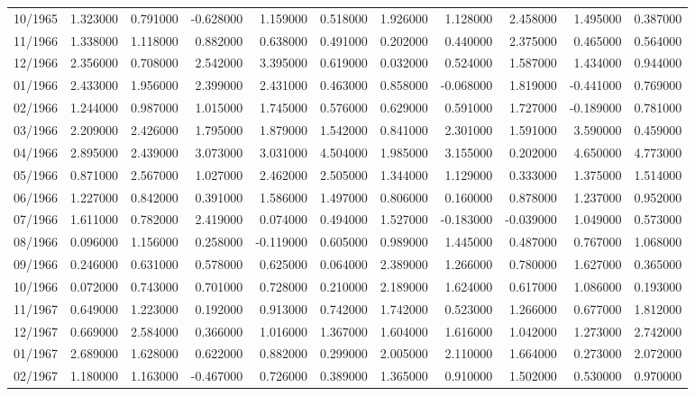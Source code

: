 \begin{tabular}{lrrrrrrrrrr}
10/1965 & 1.323000 & 0.791000 & -0.628000 & 1.159000 & 0.518000 & 1.926000 & 1.128000 & 2.458000 & 1.495000 & 0.387000 \\
11/1966 & 1.338000 & 1.118000 & 0.882000 & 0.638000 & 0.491000 & 0.202000 & 0.440000 & 2.375000 & 0.465000 & 0.564000 \\
12/1966 & 2.356000 & 0.708000 & 2.542000 & 3.395000 & 0.619000 & 0.032000 & 0.524000 & 1.587000 & 1.434000 & 0.944000 \\
01/1966 & 2.433000 & 1.956000 & 2.399000 & 2.431000 & 0.463000 & 0.858000 & -0.068000 & 1.819000 & -0.441000 & 0.769000 \\
02/1966 & 1.244000 & 0.987000 & 1.015000 & 1.745000 & 0.576000 & 0.629000 & 0.591000 & 1.727000 & -0.189000 & 0.781000 \\
03/1966 & 2.209000 & 2.426000 & 1.795000 & 1.879000 & 1.542000 & 0.841000 & 2.301000 & 1.591000 & 3.590000 & 0.459000 \\
04/1966 & 2.895000 & 2.439000 & 3.073000 & 3.031000 & 4.504000 & 1.985000 & 3.155000 & 0.202000 & 4.650000 & 4.773000 \\
05/1966 & 0.871000 & 2.567000 & 1.027000 & 2.462000 & 2.505000 & 1.344000 & 1.129000 & 0.333000 & 1.375000 & 1.514000 \\
06/1966 & 1.227000 & 0.842000 & 0.391000 & 1.586000 & 1.497000 & 0.806000 & 0.160000 & 0.878000 & 1.237000 & 0.952000 \\
07/1966 & 1.611000 & 0.782000 & 2.419000 & 0.074000 & 0.494000 & 1.527000 & -0.183000 & -0.039000 & 1.049000 & 0.573000 \\
08/1966 & 0.096000 & 1.156000 & 0.258000 & -0.119000 & 0.605000 & 0.989000 & 1.445000 & 0.487000 & 0.767000 & 1.068000 \\
09/1966 & 0.246000 & 0.631000 & 0.578000 & 0.625000 & 0.064000 & 2.389000 & 1.266000 & 0.780000 & 1.627000 & 0.365000 \\
10/1966 & 0.072000 & 0.743000 & 0.701000 & 0.728000 & 0.210000 & 2.189000 & 1.624000 & 0.617000 & 1.086000 & 0.193000 \\
11/1967 & 0.649000 & 1.223000 & 0.192000 & 0.913000 & 0.742000 & 1.742000 & 0.523000 & 1.266000 & 0.677000 & 1.812000 \\
12/1967 & 0.669000 & 2.584000 & 0.366000 & 1.016000 & 1.367000 & 1.604000 & 1.616000 & 1.042000 & 1.273000 & 2.742000 \\
01/1967 & 2.689000 & 1.628000 & 0.622000 & 0.882000 & 0.299000 & 2.005000 & 2.110000 & 1.664000 & 0.273000 & 2.072000 \\
02/1967 & 1.180000 & 1.163000 & -0.467000 & 0.726000 & 0.389000 & 1.365000 & 0.910000 & 1.502000 & 0.530000 & 0.970000 \\

\end{tabular}
